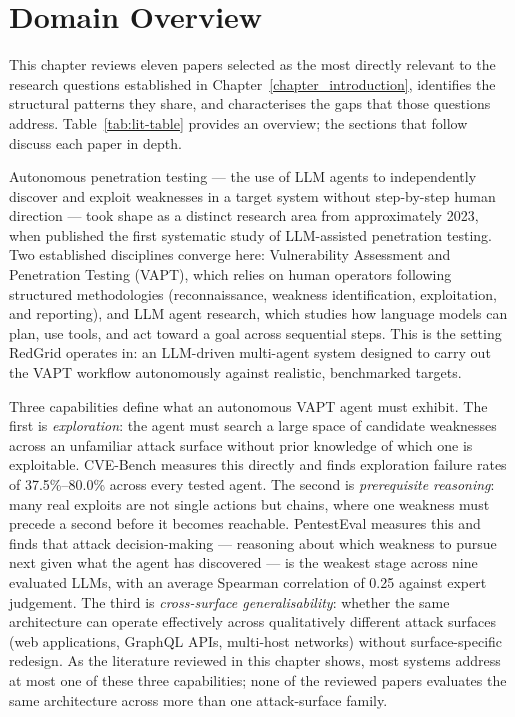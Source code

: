 \section{Domain Overview}
\label{sec_domain_overview}

This chapter reviews eleven papers selected as the most directly relevant to the research questions established in Chapter~\ref{chapter_introduction}, identifies the structural patterns they share, and characterises the gaps that those questions address. Table~\ref{tab:lit-table} provides an overview; the sections that follow discuss each paper in depth.

Autonomous penetration testing --- the use of LLM agents to independently discover and exploit weaknesses in a target system without step-by-step human direction --- took shape as a distinct research area from approximately 2023, when \citet{deng2024pentestgpt} published the first systematic study of LLM-assisted penetration testing. Two established disciplines converge here: Vulnerability Assessment and Penetration Testing (VAPT), which relies on human operators following structured methodologies (reconnaissance, weakness identification, exploitation, and reporting), and LLM agent research, which studies how language models can plan, use tools, and act toward a goal across sequential steps. This is the setting RedGrid operates in: an LLM-driven multi-agent system designed to carry out the VAPT workflow autonomously against realistic, benchmarked targets.

Three capabilities define what an autonomous VAPT agent must exhibit. The first is \emph{exploration}: the agent must search a large space of candidate weaknesses across an unfamiliar attack surface without prior knowledge of which one is exploitable. CVE-Bench \citep{zhu2025cvebench} measures this directly and finds exploration failure rates of 37.5\%--80.0\% across every tested agent. The second is \emph{prerequisite reasoning}: many real exploits are not single actions but chains, where one weakness must precede a second before it becomes reachable. PentestEval \citep{yang2025pentesteval} measures this and finds that attack decision-making --- reasoning about which weakness to pursue next given what the agent has discovered --- is the weakest stage across nine evaluated LLMs, with an average Spearman correlation of 0.25 against expert judgement. The third is \emph{cross-surface generalisability}: whether the same architecture can operate effectively across qualitatively different attack surfaces (web applications, GraphQL APIs, multi-host networks) without surface-specific redesign. As the literature reviewed in this chapter shows, most systems address at most one of these three capabilities; none of the reviewed papers evaluates the same architecture across more than one attack-surface family.

